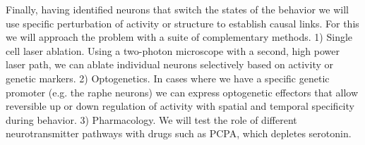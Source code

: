 Finally, having identified neurons that switch the states of the behavior we will use specific perturbation of activity or structure to establish causal links. For this we will approach the problem with a suite of complementary methods. 1) Single cell laser ablation. Using a two-photon microscope with a second, high power laser path, we can ablate individual neurons selectively based on activity or genetic markers. 2) Optogenetics. In cases where we have a specific genetic promoter (e.g. the raphe neurons) we can express optogenetic effectors that allow reversible up or down regulation of activity with spatial and temporal specificity during behavior. 3) Pharmacology. We will test the role of different neurotransmitter pathways with drugs such as PCPA, which depletes serotonin.